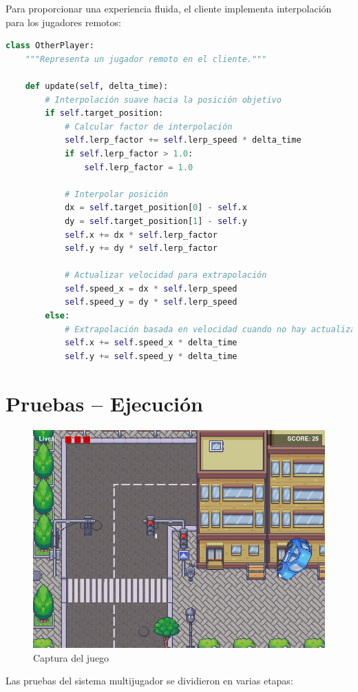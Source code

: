 \documentclass[11pt,letterpaper]{article}
\begin{document}
Para proporcionar una experiencia fluida, el cliente implementa interpolación para los jugadores remotos:

\begin{lstlisting}[language=python, caption=Implementación de interpolación para jugadores remotos]
class OtherPlayer:
    """Representa un jugador remoto en el cliente."""
    
    def update(self, delta_time):
        # Interpolación suave hacia la posición objetivo
        if self.target_position:
            # Calcular factor de interpolación
            self.lerp_factor += self.lerp_speed * delta_time
            if self.lerp_factor > 1.0:
                self.lerp_factor = 1.0
            
            # Interpolar posición
            dx = self.target_position[0] - self.x
            dy = self.target_position[1] - self.y
            self.x += dx * self.lerp_factor
            self.y += dy * self.lerp_factor
            
            # Actualizar velocidad para extrapolación
            self.speed_x = dx * self.lerp_speed
            self.speed_y = dy * self.lerp_speed
        else:
            # Extrapolación basada en velocidad cuando no hay actualizaciones
            self.x += self.speed_x * delta_time
            self.y += self.speed_y * delta_time
\end{lstlisting}

\section{Pruebas – Ejecución}

\begin{figure}
    \centering
    \includegraphics[width=0.5\linewidth]{images/image_game_1.png}
    \caption{Captura del juego}
    \label{fig:enter-label}
\end{figure}

Las pruebas del sistema multijugador se dividieron en varias etapas:
\end{document}
